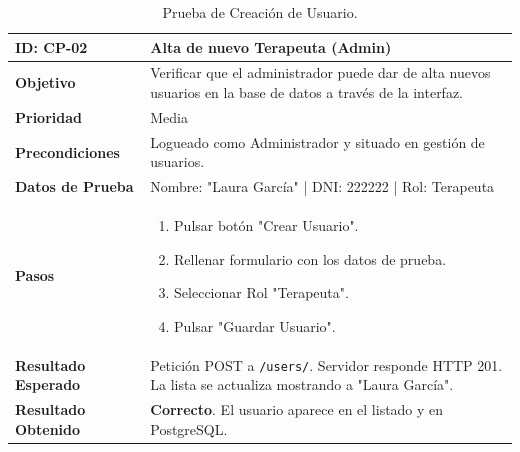 \begin{table}[H]
    \centering
    \begin{tabularx}{\textwidth}{|l|X|}
        \hline
        \rowcolor{gray!25} \textbf{ID: CP-02} & \textbf{Alta de nuevo Terapeuta (Admin)} \\ \hline
        \textbf{Objetivo} & Verificar que el administrador puede dar de alta nuevos usuarios en la base de datos a través de la interfaz. \\ \hline
        \textbf{Prioridad} & Media \\ \hline
        \textbf{Precondiciones} & Logueado como Administrador y situado en gestión de usuarios. \\ \hline
        \textbf{Datos de Prueba} & Nombre: "Laura García" | DNI: 222222 | Rol: Terapeuta \\ \hline
        \textbf{Pasos} & 
        \vspace*{-\baselineskip}
        \begin{enumerate}
            \item Pulsar botón "Crear Usuario".
            \item Rellenar formulario con los datos de prueba.
            \item Seleccionar Rol "Terapeuta".
            \item Pulsar "Guardar Usuario".
        \end{enumerate} \\ \hline
        \textbf{Resultado Esperado} & Petición POST a \texttt{/users/}. Servidor responde HTTP 201. La lista se actualiza mostrando a "Laura García". \\ \hline
        \textbf{Resultado Obtenido} & \textcolor{green!40!black}{\textbf{Correcto}}. El usuario aparece en el listado y en PostgreSQL. \\ \hline
    \end{tabularx}
    \caption{Prueba de Creación de Usuario.}
\end{table}

